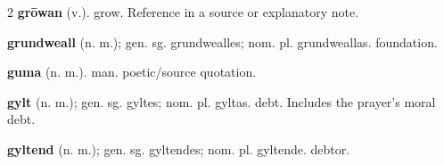 \begin{multicols*}{2}
\textbf{grōwan} (v.). grow. Reference in a source or explanatory note.\par
\textbf{grundweall} (n. m.); gen. sg. grundwealles; nom. pl. grundweallas. foundation.\par
\textbf{guma} (n. m.). man. poetic/source quotation.\par
\textbf{gylt} (n. m.); gen. sg. gyltes; nom. pl. gyltas. debt. Includes the prayer's moral debt.\par
\textbf{gyltend} (n. m.); gen. sg. gyltendes; nom. pl. gyltende. debtor.\par

\end{multicols*}
